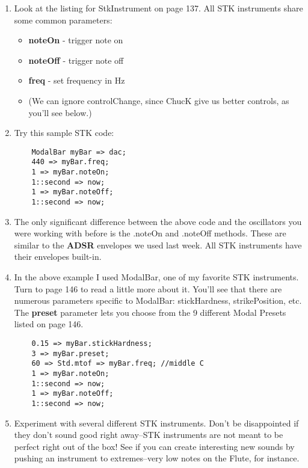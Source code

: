 \documentclass{article}
\begin{document}
\begin{enumerate}

\item Look at the listing for StkInstrument on page 137. All STK instruments share some common parameters:

\begin {itemize}

\item \textbf{noteOn} - trigger note on
\item \textbf{noteOff} - trigger note off
\item \textbf{freq} - set frequency in Hz
\item (We can ignore controlChange, since ChucK give us better controls, as you'll see below.)
\end {itemize}

\item{Try this sample STK code:}

\begin{lstlisting}
	ModalBar myBar => dac;
	440 => myBar.freq;
	1 => myBar.noteOn;
	1::second => now;
	1 => myBar.noteOff;
	1::second => now;
\end{lstlisting}

\item The only significant difference between the above code and the oscillators you were working with before is the .noteOn and .noteOff methods. These are similar to the \textbf{ADSR} envelopes we used last week. All STK instruments have their envelopes built-in.

\item In the above example I used ModalBar, one of my favorite STK instruments. Turn to page 146 to read a little more about it. You'll see that there are numerous parameters specific to ModalBar: stickHardness, strikePosition, etc. The \textbf{preset} parameter lets you choose from the 9 different Modal Presets listed on page 146.

\begin{lstlisting}
	0.15 => myBar.stickHardness;
	3 => myBar.preset;
	60 => Std.mtof => myBar.freq; //middle C
	1 => myBar.noteOn;
	1::second => now;
	1 => myBar.noteOff;
	1::second => now;
\end{lstlisting}

\item Experiment with several different STK instruments. Don't be disappointed if they don't sound good right away--STK instruments are not meant to be perfect right out of the box! See if you can create interesting new sounds by pushing an instrument to extremes--very low notes on the Flute, for instance.


\end{enumerate}
\end{document}
